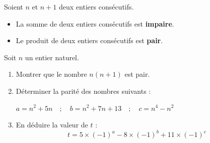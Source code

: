 \documentclass[10pt, a4paper]{article}
\begin{document}
\begin{Propriete}
Soient $n$ et $n+1$ deux entiers consécutifs.
\begin{itemize}[leftmargin=*,itemsep=0.5pt]
  \item La somme de deux entiers consécutifs est \textbf{impaire}.
  \item Le produit de deux entiers consécutifs est \textbf{pair}.
\end{itemize}
\end{Propriete}


\begin{Application}[][15 min]
Soit $n$ un entier naturel.
\begin{enumerate}[leftmargin=*,itemsep=0.5pt]
    \item Montrer que le nombre $n(n+1)$ est pair.
    \item Déterminer la parité des nombres suivants :
\begin{center}
$a=n^2+5n \quad ; \quad b=n^2+7n+13 \quad ; \quad c=n^4-n^2$
\end{center}
\item En déduire la valeur de $t$ :
\[  t=5\times(-1)^a-8\times(-1)^b+11\times(-1)^c \]
\end{enumerate}
\end{Application}
\end{document}
